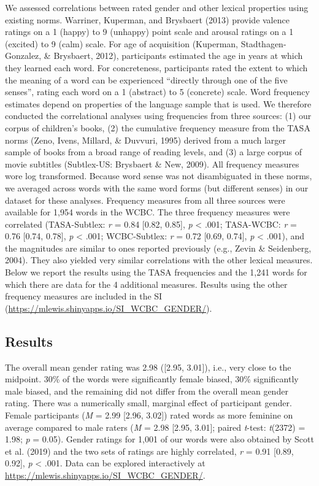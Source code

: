 \documentclass[english,,man,floatsintext]{apa6}
\begin{document}
We assessed correlations between rated gender and other lexical properties using existing norms. Warriner, Kuperman, and Brysbaert (2013) provide valence ratings on a 1 (happy) to 9 (unhappy) point scale and arousal ratings on a 1 (excited) to 9 (calm) scale. For age of acquisition (Kuperman, Stadthagen-Gonzalez, \& Brysbaert, 2012), participants estimated the age in years at which they learned each word. For concreteness, participants rated the extent to which the meaning of a word can be experienced \enquote{directly through one of the five senses}, rating each word on a 1 (abstract) to 5 (concrete) scale. Word frequency estimates depend on properties of the language sample that is used. We therefore conducted the correlational analyses using frequencies from three sources: (1) our corpus of children's books, (2) the cumulative frequency measure from the TASA norms (Zeno, Ivens, Millard, \& Duvvuri, 1995) derived from a much larger sample of books from a broad range of reading levels, and (3) a large corpus of movie subtitles (Subtlex-US: Brysbaert \& New, 2009). All frequency measures wore log transformed. Because word sense was not disambiguated in these norms, we averaged across words with the same word forms (but different senses) in our dataset for these analyses. Frequency measures from all three sources were available for 1,954 words in the WCBC. The three frequency measures were correlated (TASA-Subtlex: \emph{r} = 0.84 {[}0.82, 0.85{]}, \emph{p} \textless{} .001; TASA-WCBC: \emph{r} = 0.76 {[}0.74, 0.78{]}, \emph{p} \textless{} .001; WCBC-Subtlex: \emph{r} = 0.72 {[}0.69, 0.74{]}, \emph{p} \textless{} .001), and the magnitudes are similar to ones reported previously (e.g., Zevin \& Seidenberg, 2004). They also yielded very similar correlations with the other lexical measures. Below we report the results using the TASA frequencies and the 1,241 words for which there are data for the 4 additional measures. Results using the other frequency measures are included in the SI (\url{https://mlewis.shinyapps.io/SI_WCBC_GENDER/}).

\hypertarget{results}{%
\subsection{Results}\label{results}}

The overall mean gender rating was 2.98 ({[}2.95, 3.01{]}), i.e., very close to the midpoint. 30\% of the words were significantly female biased, 30\% significantly male biased, and the remaining did not differ from the overall mean gender rating. There was a numerically small, marginal effect of participant gender. Female participants (\emph{M} = 2.99 {[}2.96, 3.02{]}) rated words as more feminine on average compared to male raters (\emph{M} = 2.98 {[}2.95, 3.01{]}; paired \emph{t}-test: \emph{t}(2372) = 1.98; \emph{p} = 0.05). Gender ratings for 1,001 of our words were also obtained by Scott et al. (2019) and the two sets of ratings are highly correlated, \emph{r} = 0.91 {[}0.89, 0.92{]}, \emph{p} \textless{} .001. Data can be explored interactively at \url{https://mlewis.shinyapps.io/SI_WCBC_GENDER/}.
\end{document}
